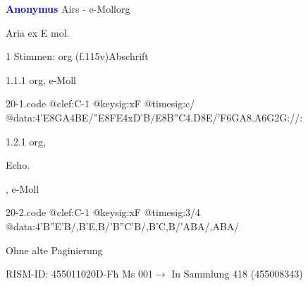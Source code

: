 \documentclass[twocolumn, 12pt]{book}
\begin{document}
\par \vspace{16pt} \textcolor{darkblue}{\textbf{Anonymus  }}\hfillplus{\textbf{[20]}}\newline Airs - e-Moll\newline org
\par \begin{itshape}[f.115v, heading:] Aria ex E mol.\end{itshape} 
\par \textcolor{darkblue}{}  1 Stimmen: org  (f.115v)\newline Abschrift
\par 1.1.1  org, e-Moll  
\begin{filecontents*}{20-1.code}
@clef:C-1
@keysig:xF
@timesig:c/
@data:4'E{8GA}4BE/''E{8FE}4xD'B/E{8B''C}4.D8E/{'F6GA}{8.A6G}2G://:
\end{filecontents*}
\newline %
\par 1.2.1  org, \begin{itshape}Echo.\end{itshape}, e-Moll  
\begin{filecontents*}{20-2.code}
@clef:C-1
@keysig:xF
@timesig:3/4
@data:4'B''E'B/,B'E,B/'B''C'B/,B'C,B/'ABA/,ABA/
\end{filecontents*}
\newline %
\par Ohne alte Paginierung
\par RISM-ID: 455011020\newline D-Fh  Ms 001\newline $\rightarrow$ In Sammlung 418 (455008343)
      
\end{document}
